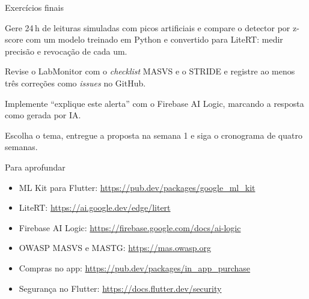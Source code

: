 \documentclass[aspectratio=169,10pt]{beamer}
\begin{document}
\begin{frame}{Exercícios finais}
  \begin{exercicio}[Exercício 1 --- IA]
    Gere 24\,h de leituras simuladas com picos artificiais e compare o detector por z-score com um modelo treinado em Python e convertido para LiteRT: medir precisão e revocação de cada um.
  \end{exercicio}
  \begin{exercicio}
    Revise o LabMonitor com o \emph{checklist} MASVS e o STRIDE e registre ao menos três correções como \emph{issues} no GitHub.
  \end{exercicio}
  \begin{exercicio}
    Implemente ``explique este alerta'' com o Firebase AI Logic, marcando a resposta como gerada por IA.
  \end{exercicio}
  \begin{projeto}
    Escolha o tema, entregue a proposta na semana 1 e siga o cronograma de quatro semanas.
  \end{projeto}
\end{frame}

\begin{frame}{Para aprofundar}
  \small
  \begin{itemize}
    \item ML Kit para Flutter: \url{https://pub.dev/packages/google_ml_kit}
    \item LiteRT: \url{https://ai.google.dev/edge/litert}
    \item Firebase AI Logic: \url{https://firebase.google.com/docs/ai-logic}
    \item OWASP MASVS e MASTG: \url{https://mas.owasp.org}
    \item Compras no app: \url{https://pub.dev/packages/in_app_purchase}
    \item Segurança no Flutter: \url{https://docs.flutter.dev/security}
  \end{itemize}
\end{frame}
\end{document}
